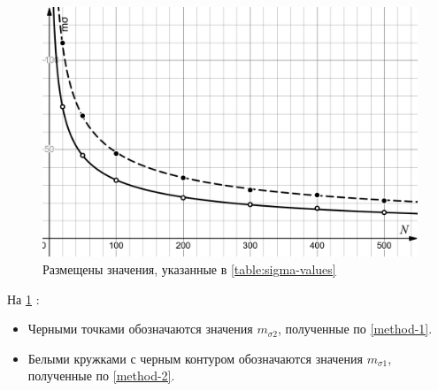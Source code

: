 \begin{figure}[h!]
	\hspace{-2em}
	\includegraphics[width=\linewidth]{graphics/desmos-graph.png}
	\caption{Размещены значения, указанные в \cref{table:sigma-values}}
	\label{fig:sigma-graph}
\end{figure}

На \cref{fig:sigma-graph} :
\begin{itemize}
	\item Черными точками обозначаются значения \(m_{\sigma2}\), полученные по \cref{method-1}.
	\item Белыми кружками с черным контуром обозначаются значения \(m_{\sigma1}\), полученные по \cref{method-2}.
\end{itemize}


